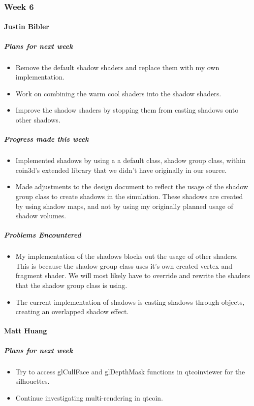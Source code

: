 {
\subsubsection{Week 6}
\paragraph{Justin Bibler}
\subparagraph{Plans for next week}
\begin{itemize}
  \item Remove the default shadow shaders and replace them with my own implementation.
  \item Work on combining the warm cool shaders into the shadow shaders.
  \item Improve the shadow shaders by stopping them from casting shadows onto other shadows.
\end{itemize}

\subparagraph{Progress made this week}
\begin{itemize}
  \item Implemented shadows by using a a default class, shadow group class, within coin3d's extended library that we didn't have originally in our source.
  \item Made adjustments to the design document to reflect the usage of the shadow group class to create shadows in the simulation. These shadows are created by using shadow maps, and not by using my originally planned usage of shadow volumes.
\end{itemize}

\subparagraph{Problems Encountered}
\begin{itemize}
  \item My implementation of the shadows blocks out the usage of other shaders. This is because the shadow group class uses it's own created vertex and fragment shader. We will most likely have to override and rewrite the shaders that the shadow group class is using.
  \item The current implementation of shadows is casting shadows through objects, creating an overlapped shadow effect.
\end{itemize}
\vspace{3mm}

\paragraph{Matt Huang}
\subparagraph{Plans for next week}
\begin{itemize}
  \item Try to access glCullFace and glDepthMask functions in qtcoinviewer for the silhouettes.
  \item Continue investigating multi-rendering in qtcoin.
\end{itemize}

}

